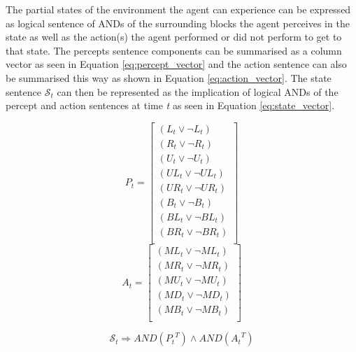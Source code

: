 The partial states of the environment the agent can experience can be expressed as logical sentence of ANDs of the surrounding blocks the agent perceives in the state as well as the action(s) the agent performed or did not perform to get to that state. The percepts sentence components can be summarised as a column vector as seen in Equation \ref{eq:percept_vector} and the action sentence can also be summarised this way as shown in Equation \ref{eq:action_vector}. The state sentence $\mathcal{S}_t$ can then be represented as the implication of logical ANDs of the percept and action sentences at time \textit{t} as seen in Equation \ref{eq:state_vector}.

\begin{multicols}{2}
  \begin{equation}
    {P_t}=
    \begin{bmatrix}
    		(L_t \vee \neg L_t)\\
    		(R_t \vee \neg R_t)\\
    		(U_t \vee \neg U_t)\\
    		(UL_t \vee \neg UL_t)\\
    		(UR_t \vee \neg UR_t)\\
    		(B_t \vee \neg B_t)\\
    		(BL_t \vee \neg BL_t)\\
    		(BR_t \vee \neg BR_t)\\
    \end{bmatrix}
    \label{eq:percept_vector}
  \end{equation}\break
  \begin{equation}
    {A_t}=
    \begin{bmatrix}
    		(ML_t \vee \neg ML_t)\\
    		(MR_t \vee \neg MR_t)\\
    		(MU_t \vee \neg MU_t)\\
    		(MD_t \vee \neg MD_t)\\
    		(MB_t \vee \neg MB_t)\\
    \end{bmatrix}
     \label{eq:action_vector}
  \end{equation}
\end{multicols}



\begin{equation}
      \mathcal{S}_t \Rightarrow AND ({P_t}^T) \wedge AND ({A_t}^T)
 \label{eq:state_vector}
\end{equation}


